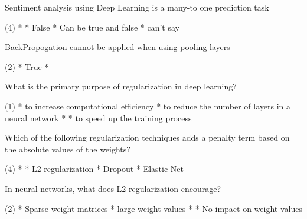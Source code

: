 \documentclass[10pt]{extarticle}
\begin{document}
\begin{exercise}
    Sentiment analysis using Deep Learning is a many-to one prediction task
    \begin{choice} (4)
        * 
        * False
        * Can be true and false
        * can't say
    \end{choice}
\end{exercise}
\begin{solution}
\end{solution}


\begin{exercise}
    BackPropogation cannot be applied when using pooling layers
    \begin{choice}(2)
        * True
        * 
    \end{choice}
\end{exercise}
\begin{solution}
\end{solution}

\begin{exercise}
    What is the primary purpose of regularization in deep learning?
    \begin{choice}(1)
        * to increase computational efficiency
        * to reduce the number of layers in a neural network
        * 
        * to speed up the training process
    \end{choice}
\end{exercise}
\begin{solution}
\end{solution}

\begin{exercise}
    Which of the following regularization techniques adds a penalty term based on the absolute values of the weights?
    \begin{choice} (4)
        * 
        * L2 regularization
        * Dropout
        * Elastic Net
    \end{choice}
\end{exercise}
\begin{solution}
\end{solution}

\begin{exercise}
    In neural networks, what does L2 regularization encourage?
    \begin{choice} (2)
        * Sparse weight matrices
        * large weight values
        * 
        * No impact on weight values
    \end{choice}
\end{exercise}
\begin{solution}
\end{solution}
\end{document}

